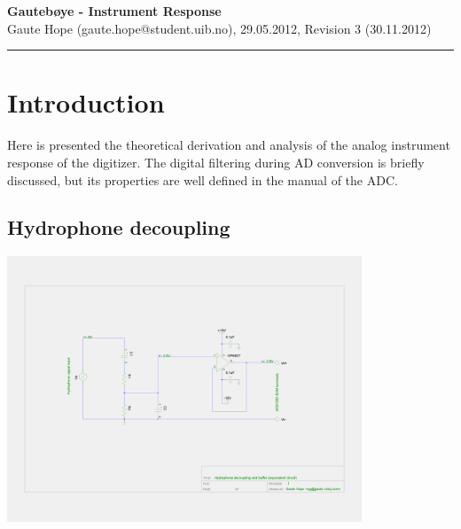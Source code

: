 \documentclass[a4paper]{article}
\newcommand{\makeheading}[2]%
        {\hspace*{-\marginparsep minus \marginparwidth}%
         \begin{minipage}[t]{\textwidth\marginparwidth\marginparsep}%
           {\large \bfseries #1}\\{#2}\\[-0.15\baselineskip]%
                 \rule{\columnwidth}{1pt}%
         \end{minipage}}
\begin{document}
\makeheading{Gautebøye - Instrument Response}{Gaute Hope
(gaute.hope@student.uib.no), 29.05.2012, Revision 3 (30.11.2012)}

\vspace{2em}
\section*{Introduction}
Here is presented the theoretical derivation and analysis of the analog
instrument response of the digitizer. The digital filtering during AD
conversion is briefly discussed, but its properties are well defined in
the manual of the ADC\cite{ads1282_ds}. \vspace{2em}

\begin{multicols}{2}
\section{Hydrophone decoupling}
\end{multicols}
\begin{center}
  \includegraphics[width=400px]{Hydrophone_decoupling.png}
  \label{fig:hydrophone_decoupling}
\end{center}
\end{document}
